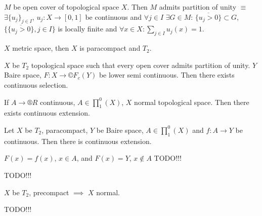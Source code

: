 \documentclass[12pt]{article}					%
\begin{document}
\begin{definice}
	$M$ be open cover of topological space $X$. Then $M$ admits partition of unity $≡$ $\exists \{u_j\}_{j \in I}$, $u_j: X \rightarrow [0, 1]$ be continuous and $\forall j \in I$ $\exists G \in M$: $\overline{\{u_j > 0\}} \subset G$, $\{\overline{\{u_j > 0\}}, j \in I\}$ is locally finite and $\forall x \in X: \sum_{j \in I} u_j(x) = 1$.
\end{definice}

\begin{poznamka}[Stone]
	$X$ metric space, then $X$ is paracompact and $T_2$.
\end{poznamka}

\begin{veta}
	$X$ be $T_2$ topological space such that every open cover admits partition of unity. $Y$ Baire space, $F: X \rightarrow ©F_c(Y)$ be lower semi continuous. Then there exists continuous selection.
\end{veta}

\begin{veta}[Tietze]
	If $A \rightarrow ®R$ continuous, $A \in ∏_1^0(X)$, $X$ normal topological space. Then there exists continuous extension.
\end{veta}

\begin{dusledek}
	Let $X$ be $T_2$, paracompact, $Y$ be Baire space, $A \in ∏_1^0(X)$ and $f: A \rightarrow Y$ be continuous. Then there is continuous extension.

	$F(x) = f(x)$, $x \in A$, and $F(x) = Y$, $x \notin A$ TODO!!!
\end{dusledek}

\begin{dusledek}
	TODO!!!
\end{dusledek}

\begin{dusledek}
	$X$ be $T_2$, precompact $\implies$ $X$ normal.
\end{dusledek}

\begin{dusledek}
	TODO!!!
\end{dusledek}
\end{document}
